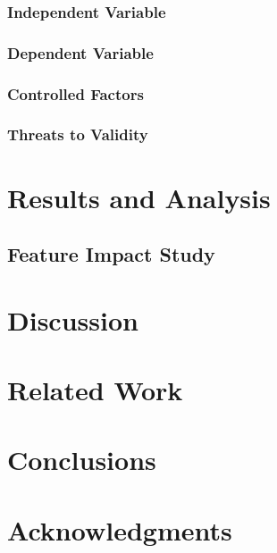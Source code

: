 \documentclass{sig-alternate}
\begin{document}
	\subsubsection{Independent Variable}
	\subsubsection{Dependent Variable }
	\subsubsection{Controlled Factors}
	\subsubsection{Threats to Validity}	

\section{Results and Analysis}

\subsection{Feature Impact Study}
\subsection{ }

\section{Discussion}

\section{Related Work}

\section{Conclusions}

\section{Acknowledgments}

%

%
%
\end{document}
